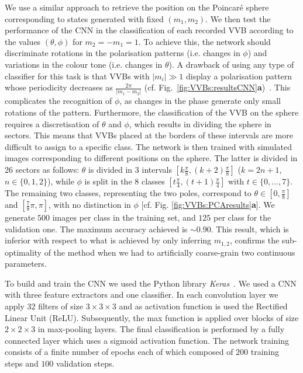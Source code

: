 We use a similar approach to retrieve the position on the Poincaré sphere corresponding to states generated with fixed $(m_1,m_2)$.
We then test the performance of the CNN in the classification of each recorded VVB according to the values $(\theta,\phi)$ for $m_2=-m_1=1$.
To achieve this, the network should discriminate rotations in the polarisation patterns (i.e. changes in $\phi$) and variations in the colour tone (i.e. changes in $\theta$). A drawback of using any type of classifier for this task is that VVBs with $|m_i|\gg1$ display a polarisation pattern whose periodicity decreases as $\frac{2\pi}{|m_1-m_2|}$ (cf. Fig.~\mbox{\ref{fig:VVBs:resultsCNN}}{\bf a})~\cite{fickler2012quantum,dambrosio2013photonic}.
This complicates the recognition of $\phi$, as changes in the phase generate only small rotations of the pattern.
Furthermore, the classification of the VVB on the sphere requires a discretisation of $\theta$ and $\phi$, which results in dividing the sphere in sectors. This means that VVBs placed at the borders of these intervals are more difficult to assign to a specific class.
The network is then trained with simulated images corresponding to different positions on the sphere. 
The latter is divided in 26 sectors as follows: $\theta$ is divided in $3$ intervals $\left[k \frac{\pi}{8}, (k+2) \frac{\pi}{8}\right]$ ($k=2n+1$, $n \in \{0,1,2\}$), while $\phi$ is split in the 8 classes $\left[t \frac{\pi}{4}, (t+1) \frac{\pi}{4}\right]$ with $t \in \{0,...,7\} $. The remaining two classes, representing the two poles, correspond to $\theta \in \left[0, \frac{\pi}{8}\right]$ and $ \left[ \frac{7}{8} \pi, \pi\right]$, with no distinction in $\phi$ [cf. Fig. \ref{fig:VVBs:PCAresults}{\bf a}].
We generate $500$ images per class in the training set, and $125$ per class for the validation one. The maximum accuracy  achieved is $\sim 0.90$. This result, which is inferior with respect to what is achieved by only inferring $m_{1,2}$,  confirms the sub-optimality of the method when we had to artificially coarse-grain two continuous parameters.

To build and train the \ac{CNN} we used the Python library \emph{Keras}~\cite{chollet2015keras}.
We used a CNN with three feature extractors and one classifier. In each convolution layer we apply $32$ filters of size $3 \times 3 \times 3$ and as activation function is used the Rectified Linear Unit (ReLU). Subsequently, the max function is applied over blocks of size $2 \times 2 \times 3$  in max-pooling layers. %
The final classification is performed by a fully connected layer which uses a sigmoid activation function. The network training consists of a finite number of epochs each of which composed of $200$ training steps and $100$ validation steps. 


